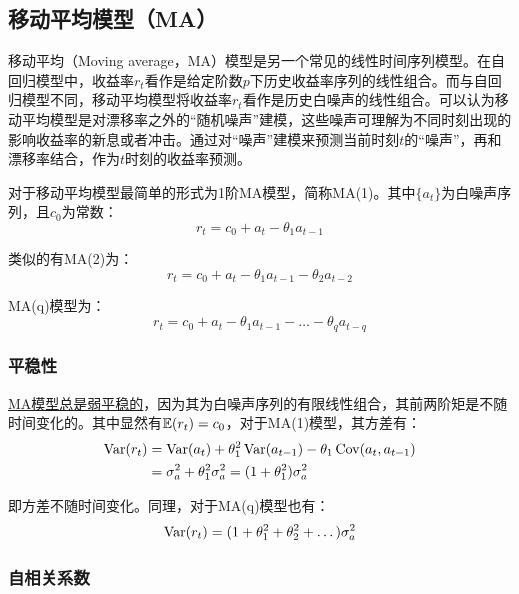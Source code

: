 \documentclass[11pt]{article}
\begin{document}
\subsection{移动平均模型（MA）}

移动平均（Moving average，MA）模型是另一个常见的线性时间序列模型。在自回归模型中，收益率$r_t$看作是给定阶数$p$下历史收益率序列的线性组合。而与自回归模型不同，移动平均模型将收益率$r_t$看作是历史白噪声的线性组合。可以认为移动平均模型是对漂移率之外的“随机噪声”建模，这些噪声可理解为不同时刻出现的影响收益率的新息或者冲击。通过对“噪声”建模来预测当前时刻$t$的“噪声”，再和漂移率结合，作为$t$时刻的收益率预测。

对于移动平均模型最简单的形式为1阶MA模型，简称MA(1)。其中$\{a_t\}$为白噪声序列，且$c_0$为常数：
\begin{equation*}
    r_t = c_0 + a_{t} - \theta_1 a_{t-1}
\end{equation*}

类似的有MA(2)为：
\begin{equation*}
    r_t = c_0 + a_{t} - \theta_1 a_{t-1} - \theta_2 a_{t-2}
\end{equation*}

MA(q)模型为：
\begin{equation*}
    r_t = c_0 + a_{t} - \theta_1 a_{t-1} - \dots - \theta_q a_{t-q}
\end{equation*}

\subsubsection*{平稳性}

\uline{MA模型总是弱平稳的}，因为其为白噪声序列的有限线性组合，其前两阶矩是不随时间变化的。其中显然有$\mathbb{E}(r_t) = c_0$，对于MA(1)模型，其方差有：
\begin{align*}
    \operatorname{Var}(r_t) &= \operatorname{Var}(a_t) + \theta_1^2 \operatorname{Var}(a_{t-1}) - \theta_1 \operatorname{Cov}(a_t,a_{t-1}) \\
    & = \sigma_{a}^{2} + \theta_1^2 \sigma_{a}^{2} = (1 + \theta_1^2) \sigma_{a}^{2}
\end{align*}

即方差不随时间变化。同理，对于MA(q)模型也有：
\begin{equation*}
    \operatorname{Var}(r_t) = (1 + \theta_1^2 + \theta_2^2 + \dots ) \sigma_{a}^{2}
\end{equation*}

\subsubsection*{自相关系数}
\end{document}
